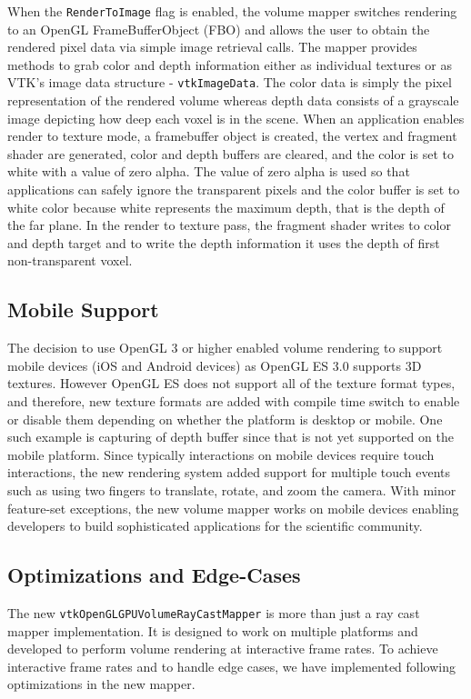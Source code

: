 When the \texttt{RenderToImage} flag is enabled, the volume mapper switches
rendering to an OpenGL FrameBufferObject (FBO) and allows the user to obtain the
rendered pixel data via simple image retrieval calls. The mapper provides
methods to grab color and depth information either as individual textures or as
VTK's image data structure - \texttt{vtkImageData}. The color data is simply the
pixel representation of the rendered volume whereas depth data consists of a
grayscale image depicting how deep each voxel is in the scene. When an
application enables render to texture mode, a framebuffer object is created, the
vertex and fragment shader are generated, color and depth buffers are cleared,
and the color is set to white with a value of zero alpha. The value of zero
alpha is used so that applications can safely ignore the transparent pixels and
the color buffer is set to white color because white represents the maximum
depth, that is the depth of the far plane. In the render to texture pass, the
fragment shader writes to color and depth target and to write the depth
information it uses the depth of first non-transparent voxel.

\subsection{Mobile Support}
The decision to use OpenGL 3 or higher enabled volume rendering to support
mobile devices (iOS and Android devices) as OpenGL ES 3.0 supports 3D textures.
However OpenGL ES does not support all of the texture format types, and
therefore, new texture formats are added with compile time switch to enable or
disable them depending on whether the platform is desktop or mobile. One such
example is capturing of depth buffer since that is not yet supported on the
mobile platform.  Since typically interactions on mobile devices require touch
interactions, the new rendering system added support for multiple touch events
such as using two fingers to translate, rotate, and zoom the camera. With minor
feature-set exceptions, the new volume mapper works on mobile devices enabling
developers to build sophisticated applications for the scientific community.

\subsection{Optimizations and Edge-Cases} The new
\texttt{vtkOpenGLGPUVolumeRayCastMapper} is more than just a ray cast mapper
implementation. It is designed to work on multiple platforms and developed to
perform volume rendering at interactive frame rates. To achieve interactive
frame rates and to handle edge cases, we have implemented following
optimizations in the new mapper.

